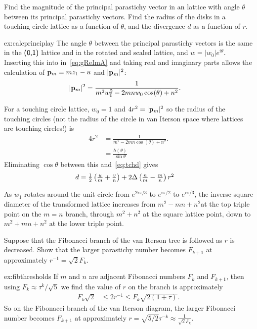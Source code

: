 \begin{jExercise}\label{ex:calcprinciplay}
	Find the magnitude of the principal parastichy vector in an   lattice with angle $\theta$ between its principal parastichy vectors.
	Find the radius of the disks in a touching circle lattice as a function of $\theta$, and the divergence $d$ as a function of $r$.
\end{jExercise}
\begin{jAnswer}{ex:calcprinciplay}
The angle  $\theta$ between the principal parastichy vectors is the same in the $\textsf{(0,1)}$ lattice and in the rotated and scaled lattice, and  $w=|w_0|e^{i\theta}$.  Inserting this into in~\eqref{eq:gReImA} and taking real and imaginary parts allows the calculation of ${\mathbf p}_{m}=m z_1 -u$ and $|{\mathbf p}_{m}|^2$: 
	\begin{align}
	|{\mathbf p}_{m}|^2 &=\frac{1}{m^2 w_0^2-2 m n w_0 \cos (\theta )+n^2}.
		\end{align}
	
		
For a touching circle lattice, $w_0=1$ and $4r^2=	|{\mathbf p}_{m}|^2$ so the radius of the touching circles (not the radius of the circle in van Iterson space where lattices are touching circles!) is
\begin{align}
4 r^{2}  &=\frac{1}{ m^2-2 m n \cos (\theta )+n^2}.
\\
&= \frac{h(\theta)}{\sin \theta}
\end{align}
Eliminating $\cos\theta$ between this and~\eqref{eq:tchd} gives
\begin{align}
d&=		\textstyle{\frac{1}{2}}
\left(\frac{u}{m}+\frac{v}{n}\right)
+ 2\Delta  \left(\frac{n}{m}-\frac{m}{n}\right)r^2
\end{align}

As $w_1$ rotates around the unit circle from $e^{2i\pi/3}$ to $e^{i\pi/2}$ to $e^{i\pi/3}$, the inverse square diameter of the transformed lattice increases from $m^2-mn+n^2$at the top triple point on the $m=n$ branch, through  $m^2+n^2$ at the square lattice point, down to $m^2+mn+n^2$  at the lower triple point.
\end{jAnswer}

\begin{jExercise}\label{ex:fibthresholds}
Suppose that the Fibonacci branch of the van Iterson tree is followed as $r$ is decreased.
Show that the larger parastichy number becomes $F_{k+1}$ at approximately  $r^{-1}={\sqrt{2}F_k}$.
\end{jExercise}
\begin{jAnswer}{ex:fibthresholds}
If $m$ and $n$ are adjacent Fibonacci numbers $F_{k}$ and $F_{k+1}$, then using $F_k\approx \tau^k/\sqrt{5}
$ we find the value of $r$ on the branch is approximately
	\begin{align}
  F_k \sqrt{2} &\leq	2 r^{-1}  \leq F_k \sqrt{2(1+\tau)}.
\end{align}
So on the Fibonacci branch of the van Iterson diagram, 
the larger Fibonacci number becomes $F_{k+1}$ at approximately $r=\sqrt{5/2}\tau^{-k}\approx \frac{1}{\sqrt{2}F_k}$.
\end{jAnswer}





